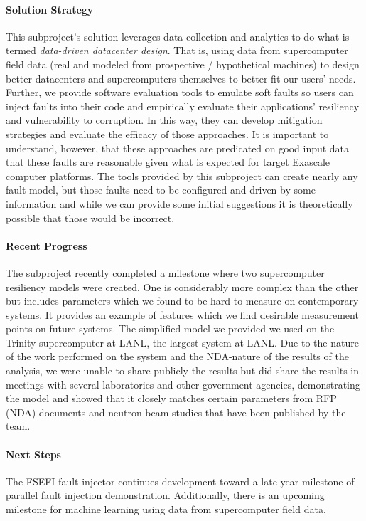 \paragraph{Solution Strategy}
This subproject's solution leverages data collection and analytics to do what
is termed \emph{data-driven datacenter design}.  That is, using data from
supercomputer field data (real and modeled from prospective / hypothetical
machines) to design better datacenters and supercomputers themselves to better
fit our users' needs.  Further, we provide software evaluation tools to emulate
soft faults so users can inject faults into their code and empirically evaluate
their applications' resiliency and vulnerability to corruption.  In this way,
they can develop mitigation strategies and evaluate the efficacy of those
approaches.  It is important to understand, however, that these approaches are
predicated on good input data that these faults are reasonable given what is
expected for target Exascale computer platforms.  The tools provided by this
subproject can create nearly any fault model, but those faults need to be
configured and driven by some information and while we can provide some initial
suggestions it is theoretically possible that those would be incorrect.

\paragraph{Recent Progress}
The subproject recently completed a milestone where two supercomputer
resiliency models were created.  One is considerably more complex than the
other but includes parameters which we found to be hard to measure on
contemporary systems.  It provides an example of features which we find
desirable measurement points on future systems.  The simplified model we
provided we used on the Trinity supercomputer at LANL, the largest system at
LANL.  Due to the nature of the work performed on the system and the NDA-nature
of the results of the analysis, we were unable to share publicly the results
but did share the results in meetings with several laboratories and other
government agencies, demonstrating the model and showed that it closely matches
certain parameters from RFP (NDA) documents and neutron beam studies that have
been published by the team.  

\paragraph{Next Steps}
The FSEFI\cite{pfsefigithub,6877352} fault injector continues development toward a late year milestone of
parallel fault injection demonstration.  Additionally, there is an upcoming
milestone for machine learning using data from supercomputer field data.

